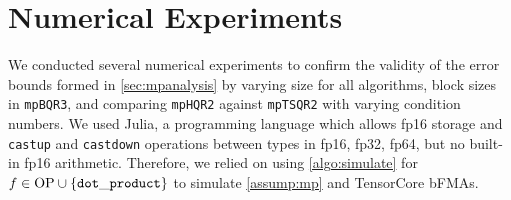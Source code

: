 \documentclass[review,onefignum,onetabnum]{siamart190516}
\begin{document}
\section{Numerical Experiments}\label{sec:NE}
%
We conducted several numerical experiments to confirm the validity of the error bounds formed in \cref{sec:mpanalysis} by varying size for all algorithms, block sizes in {\tt mpBQR3}, and comparing {\tt mpHQR2} against {\tt mpTSQR2} with varying condition numbers.
We used Julia, a programming language which allows fp16 storage and {\tt castup} and {\tt castdown} operations between types in {fp16, fp32, fp64}, but no built-in fp16 arithmetic.
Therefore, we relied on using \cref{algo:simulate} for $f\in \text{OP} \cup\{{\tt dot\_product}\}$ to simulate \cref{assump:mp} and TensorCore bFMAs.\par
\end{document}
